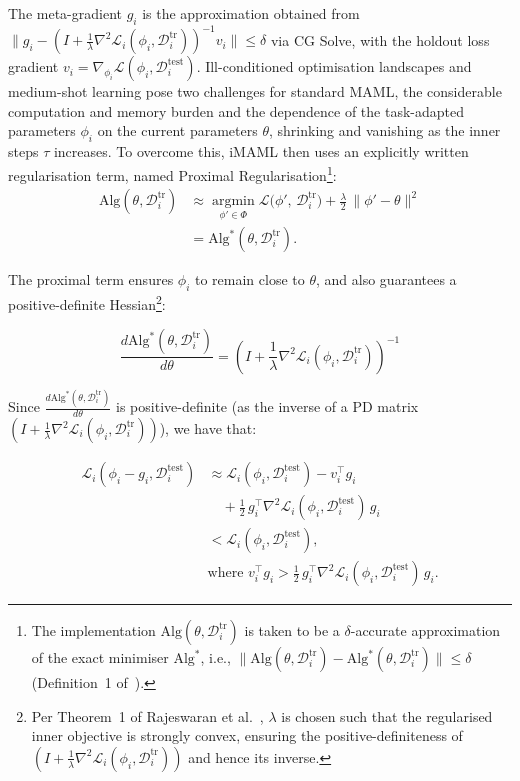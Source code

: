 \documentclass[10pt,journal,compsoc]{IEEEtran}
\begin{document}
The meta-gradient $g_i$ is the approximation obtained from $\lVert g_i - (I +
\frac{1}{\lambda}\nabla^2\mathcal{L}_i(\phi_i, \mathcal{D}^{\text{tr}}_i))^{-1}v_i\rVert \leq \delta$
via CG Solve, with the holdout loss gradient $v_i =
\nabla_{\phi_i}\mathcal{L}(\phi_i, \mathcal{D}^{\text{test}}_i)$.
Ill-conditioned optimisation landscapes and medium-shot learning pose two
challenges for standard MAML, the considerable computation and memory burden
and the dependence of the task-adapted parameters ${\phi_i}$ on the current
parameters $\theta$, shrinking and vanishing as the inner steps $\tau$
increases. To overcome this, iMAML then uses an explicitly written regularisation
term, named Proximal Regularisation\footnote{The implementation $\text{Alg}(\theta, \mathcal{D}^{\text{tr}}_i)$ is taken to be a $\delta$-accurate approximation of the exact minimiser $\text{Alg}^*$, i.e., $\lVert \text{Alg}(\theta, \mathcal{D}^{\text{tr}}_i) - \text{Alg}^*(\theta, \mathcal{D}^{\text{tr}}_i) \rVert \leq \delta$ (Definition~1 of~\cite{rajeswaran2019}).}:
\begin{align*}
\text{Alg}(\theta, \mathcal{D}^{\text{tr}}_i)
&\approx \operatorname*{argmin}_{\phi' \in \Phi}
\mathcal{L}\big(\phi',\, \mathcal{D}^{\mathrm{tr}}_i\big) + \frac{\lambda}{2}\,\big\lVert \phi' - \theta \big\rVert^2 \\
&= \text{Alg}^*(\theta, \mathcal{D}^{\text{tr}}_i).
\end{align*}

The proximal term ensures $\phi_i$ to remain close to $\theta$, and also guarantees
a positive-definite Hessian\footnote{Per Theorem~1 of Rajeswaran et al.~\cite{rajeswaran2019}, $\lambda$ is chosen such that the regularised inner objective is strongly convex, ensuring the positive-definiteness of $\left(I + \frac{1}{\lambda}\nabla^2\mathcal{L}_i(\phi_i, \mathcal{D}^{\text{tr}}_i)\right)$ and hence its inverse.}:

$$\frac{d\text{Alg}^*(\theta, \mathcal{D}^{\text{tr}}_i)}{d{\theta}} = \left(I + \frac{1}{\lambda}\nabla^2\mathcal{L}_i(\phi_i, \mathcal{D}^{\text{tr}}_i)\right)^{-1}$$

Since $\frac{d\text{Alg}^*(\theta, \mathcal{D}^{\text{tr}}_i)}{d{\theta}}$ is positive-definite (as the inverse of a PD matrix $\left(I + \frac{1}{\lambda}\nabla^2\mathcal{L}_i(\phi_i, \mathcal{D}^{\text{tr}}_i)\right)$), we have that:

\begin{align*}
\mathcal{L}_{i}(\phi_i - g_{i}, \mathcal{D}^{\text{test}}_i)
&\approx \mathcal{L}_{i}(\phi_i, \mathcal{D}^{\text{test}}_i) - v_i^\top g_i \\
&\quad + \tfrac{1}{2}\, g_i^\top \nabla^2 \mathcal{L}_i(\phi_i, \mathcal{D}^{\text{test}}_i)\, g_i \\
&< \mathcal{L}_i(\phi_i, \mathcal{D}^{\text{test}}_i), \\
&\text{where } v_i^\top g_i > \tfrac{1}{2}\, g_i^\top \nabla^2 \mathcal{L}_i(\phi_i, \mathcal{D}^{\text{test}}_i)\, g_i.
\end{align*}
\end{document}
